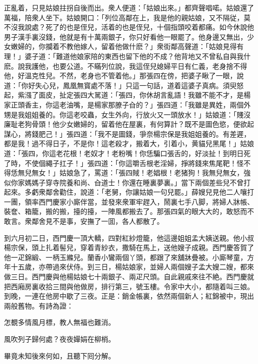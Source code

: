 正亂着，只見姑娘拄拐自後而出。衆人便道：「姑娘出來。」都齊聲唱喏。姑娘還了萬福，陪衆人坐下。姑娘開口：「列位高鄰在上，我是他的親姑娘，又不隔従，莫不沒我說處？死了的也是侄兒，活着的也是侄兒，十個指頭咬着都痛。如今休說他男子漢手裏沒錢，他就是有十萬兩銀子，你只好看他一眼罷了。他身邊又無出，少女嫩婦的，你攔着不教他嫁人，留着他做什麽？」衆街鄰高聲道：「姑娘見得有理！」婆子道：「難道他娘家陪的東西也留下他的不成？他背地又不曾私自與我什麽。說我護他，也要公道。不瞞列位說，我這侄兒媳婦平日有仁義，老身捨不得他，好溫克性兒。不然，老身也不管着他。」那張四在傍，把婆子瞅了一眼，說道：「你好失心兒，鳳凰無寳處不落！」只這一句話，道着這婆子真病。須臾怒起，紫漒了面皮，扯定張四大駡道：「張四，你休胡言亂語！我雖不能不才，是楊家正頭香主，你這老油嘴，是楊家那膫子㒲的？」張四道：「我雖是異姓，兩個外甥是我姐姐養的。你這老咬蟲，女生外向，行放火又一頭放水！」姑娘道：「賤沒廉耻老狗骨頭！他少女嫩婦的，留着他在屋裏，有何算計？既不是圖色慾，便欲起謀心，將錢肥己！」張四道：「我不是圖錢，爭奈楊宗保是我姐姐養的。有差遲，都是我！過不得日子，不是你！這老殺才，搬着大，引着小，黄貓兒黑尾！」姑娘道：「張四，你這老花根！老奴才！老粉嘴！你恁騙口張舌的，好淡扯！到明日死了時，不使個繩子扛子！」張四道：「你這嚼舌根老淫婦，掙將錢來焦尾靶！怪不得恁無兒無女！」姑娘急了，罵道：「張四賊！老娼根！老猪狗！我無兒無女，強似你家媽媽子穿寺院養和尚、㒲道士！你還在睡裏夢裏。」當下兩個差些兒不曾打起來。多虧衆鄰舍勸住，說道：「老舅，你讓姑娘一句兒罷。」薛嫂兒見他二人嚷打一團，領率西門慶家小廝伴當，並發來衆軍牢趕入，鬧裏七手八脚，將婦人牀帳、裝奩、箱籠，搬的搬，擡的擡，一陣風都搬去了。那張四氣的眼大大的，敢怒而不敢言。衆鄰舍見不是事，安撫了一囬，各人都散了。

到六月初二日，西門慶一頂大轎，四對紅紗燈籠，他這邊姐姐孟大姨送親。他小叔楊宗保，頭上扎着髻兒，穿着青紗衣，撒騎在馬上，送他嫂子成親。西門慶答賀了他一疋錦緞、一柄玉縧兒。蘭香小鸞兩個丫頭，都跟了來舖牀疊被。小廝琴童，方年十五歲，亦帶過來伏侍。到三日，楊姑娘家，並婦人兩個嫂子孟大嫂二嫂，都來做三日。西門慶與他楊姑娘七十兩銀子、兩疋尺頭。自此親戚來往不絶。西門慶就把西廂房裏收拾三間與他做房，排行第三，號玉樓。令家中大小，都隨着叫三娘。到晚，一連在他房中歇了三夜。正是：銷金帳裏，依然兩個新人；紅錦被中，現出兩般舊物。有詩為證：
\begin{myquote}
怎覩多情風月標，教人無福也難消。

風吹列子歸何處？夜夜嬋娟在柳梢。
\end{myquote}

畢竟未知後來何如，且聽下囘分解。

